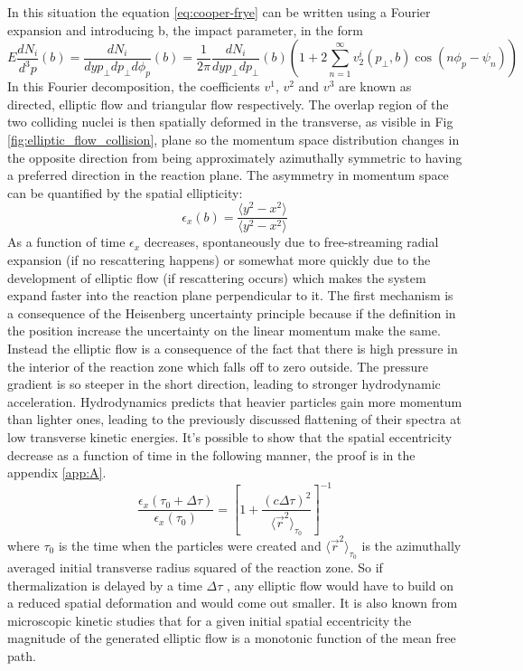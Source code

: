 \documentclass[12pt,a4paper]{book}
\begin{document}
	In this situation the equation \ref{eq:cooper-frye} can be written using a Fourier expansion and introducing b, the impact parameter, in the form
	\begin{equation}
		E \frac{dN_i}{d^3 p}(b)= \frac{dN_i}{dy p_\perp dp_\perp d\phi_p} (b) = \frac{1}{2\pi} \frac{dN_i}{dy p_\perp dp_\perp} (b) \left(1 + 2 \sum_{n=1}^{\infty} v_2^i(p_\perp,b) \cos(n\phi_p-\psi_n) \right)
	\end{equation}
	In this Fourier decomposition, the coefficients $v^1$, $v^2$ and $v^3$ are known as directed, elliptic flow and triangular flow respectively. The overlap region of the two colliding nuclei is then spatially deformed in the transverse, as visible in Fig \ref{fig:elliptic_flow_collision}, plane so the momentum space distribution changes in the opposite direction from being approximately azimuthally symmetric to having a preferred direction in the reaction plane. The asymmetry in momentum space can be quantified by the spatial ellipticity:
	\begin{equation}
		\epsilon_x(b)=\frac{\langle y^2 - x^2\rangle}{\langle y^2 - x^2\rangle}
		\label{eq:anisotropy}
	\end{equation}
	As a function of time $\epsilon_x$ decreases, spontaneously due to free-streaming radial expansion (if no rescattering happens) or somewhat more quickly due to the development of elliptic flow (if rescattering occurs) which makes the system expand faster into the reaction plane perpendicular to it. The first mechanism is a consequence of the Heisenberg uncertainty principle because if the definition in the position increase the uncertainty on the linear momentum make the same. Instead the elliptic flow is a consequence of the fact that there is high pressure in the interior of the reaction zone which falls off to zero outside. The pressure gradient is so steeper in the short direction, leading to stronger hydrodynamic acceleration. Hydrodynamics predicts that heavier particles gain more momentum than lighter ones, leading to the previously discussed flattening of their spectra at low transverse kinetic energies. It's possible to show that the spatial eccentricity decrease as a function of time in the following manner, the proof is in the appendix \ref{app:A}.
	\begin{equation}
		\frac{\epsilon_x(\tau_0 + \Delta \tau)}{\epsilon_x(\tau_0)} = \left[1+ \frac{(c \Delta \tau)^2}{\langle \vec{r}^2 \rangle_{\tau_0}} \right]^{-1}
	\end{equation}
	where $\tau_0$ is the time when the particles were created and $\langle \vec{r}^2 \rangle_{\tau_0}$ is the azimuthally averaged initial transverse radius squared of the reaction zone. So if thermalization is delayed by a time $\Delta \tau$ , any elliptic flow would have to build on a reduced spatial deformation and would come out smaller. It is also known from microscopic kinetic studies that for a given initial spatial eccentricity the magnitude of the generated elliptic flow is a monotonic function of the mean free path.
	
\end{document}
